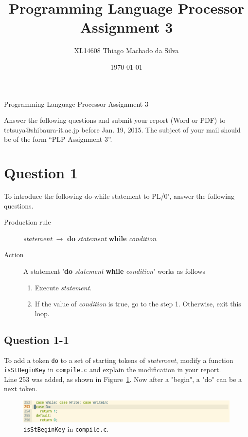 \documentclass{article}
\title{Programming Language Processor \\ Assignment 3}
\author{XL14608   Thiago Machado da Silva}
\date{\today}
\begin{document}
\ifreport
\maketitle
\else
\begin{center}
{\huge Programming Language Processor Assignment 3}
\end{center}
Answer the following questions and submit your report (Word or PDF) to
tetsuya@shibaura-it.ac.jp before Jan. 19, 2015. 
The subject of your mail should be of the form ``PLP Assignment 3''.
\fi


\section*{Question 1}

To introduce the following do-while statement to PL/0', answer the following questions.
\begin{description}
 \item[Production rule] {\it statement}  $\to$ {\bf do} {\it statement} {\bf while} {\it condition}
 \item[Action] A statement '{\bf do} {\it statement} {\bf while} {\it condition}' works as follows
	    \begin{enumerate}
	     \item Execute {\it statement}.
	     \item If the value of {\it condition} is true, go to the step 1. Otherwise, exit this loop.
	    \end{enumerate}
\end{description}

\subsection*{Question 1-1}
To add a token {\tt do} to a set of starting tokens of {\it statement},
modify a function {\tt isStBeginKey} in {\tt compile.c} and explain the modification in your report.\\[0.3cm]

\ifreport
Line 253 was added, as shown in Figure~\ref{fig:q11}. Now after a "begin", a "do" can be a next token.\\
\begin{figure}[h]
  \includegraphics[scale=0.35]{./img/Q1-1.png}
  \centering
  \caption{{\tt isStBeginKey} in {\tt compile.c}.}
  \label{fig:q11}
\end{figure}
\fi
\end{document}
